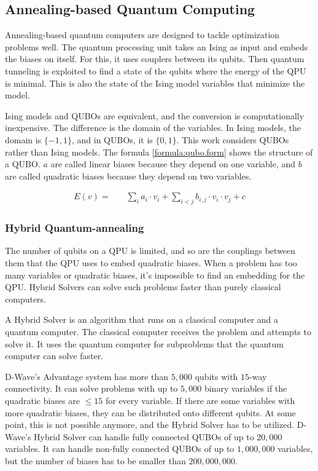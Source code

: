 \subsection{Annealing-based Quantum Computing}
\label{fundamentals:annealing}

Annealing-based quantum computers are designed to tackle optimization problems well.
The quantum processing unit takes an Ising as input and embeds the biases on itself.
For this, it uses couplers between its qubits.
Then quantum tunneling is exploited to find a state of the qubits where the energy of the QPU is minimal.
This is also the state of the Ising model variables that minimize the model.
\cite{Boixo2013}

Ising models and QUBOs are equivalent, and the conversion is computationally inexpensive.
The difference is the domain of the variables.
\cite{Bian2010}
In Ising models, the domain is $\{-1, 1\}$, and in QUBOs, it is $\{0, 1\}$.
This work considers QUBOs rather than Ising models.
The formula \ref{formula:qubo.form} shows the structure of a QUBO.
$a$ are called linear biases because they depend on one variable, and $b$ are called quadratic biases because they depend on two variables.

\begin{align}
  \label{formula:qubo.form}
  E(v) = & \quad
  \sum_i a_i \cdot v_i
  + \sum_{i < j} b_{i, j} \cdot v_i \cdot v_j
  + c
\end{align}

\subsubsection{Hybrid Quantum-annealing}

The number of qubits on a QPU is limited, and so are the couplings between them that the QPU uses to embed quadratic biases.
When a problem has too many variables or quadratic biases, it's impossible to find an embedding for the QPU.
Hybrid Solvers can solve such problems faster than purely classical computers.
\cite{Bernoudy2020}

A Hybrid Solver is an algorithm that runs on a classical computer and a quantum computer.
The classical computer receives the problem and attempts to solve it.
It uses the quantum computer for subproblems that the quantum computer can solve faster.
\cite{Zhang2016}

D-Wave's Advantage system has more than $5, 000$ qubits with $15$-way connectivity.
\cite{D-Wave2020}
It can solve problems with up to $5, 000$ binary variables if the quadratic biases are $\leq 15$ for every variable.
If there are some variables with more quadratic biases, they can be distributed onto different qubits.
At some point, this is not possible anymore, and the Hybrid Solver has to be utilized.
D-Wave's Hybrid Solver can handle fully connected QUBOs of up to $20, 000$ variables.
It can handle non-fully connected QUBOs of up to $1, 000, 000$ variables, but the number of biases has to be smaller than $200, 000, 000$.
\cite{Bernoudy2020}


